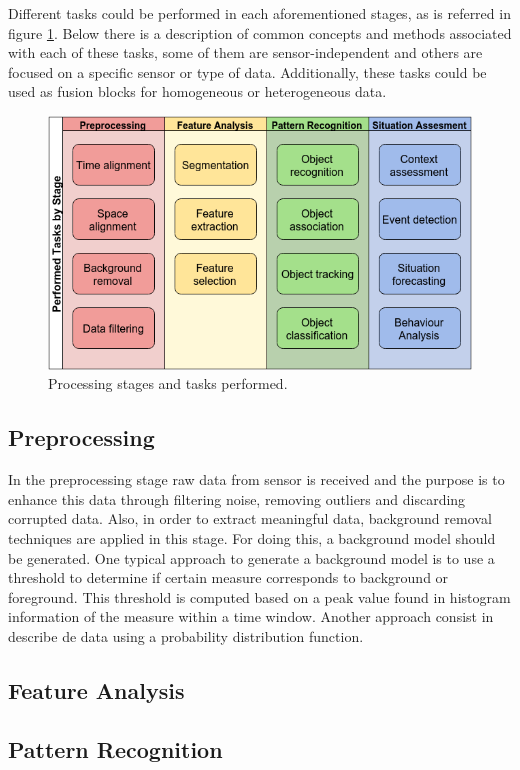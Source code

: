 \documentclass[10pt,twocolumn,letterpaper]{article}
\begin{document}
Different tasks could be performed in each aforementioned stages, as is referred in figure \ref{proc_stages_tasks}. Below there is a description of common concepts and methods associated with each of these tasks, some of them are sensor-independent and others are focused on a specific sensor or type of data. Additionally, these tasks could be used as fusion blocks for homogeneous or heterogeneous data.

\begin{figure}[ht!]
\centering
\includegraphics[scale=0.35]{../fig/3/processing_stages_and_tasks.png}
\caption{Processing stages and tasks performed.}
\label{proc_stages_tasks}
\end{figure}
\subsection{Preprocessing}
 In the preprocessing stage raw data from sensor is received and the purpose is to enhance this data through filtering noise, removing outliers and discarding corrupted data. Also, in order to extract meaningful data, background removal techniques are applied in this stage. For doing this, a background model should be generated. One typical approach to generate a background model is to use a threshold to determine if certain measure corresponds to background or foreground. This threshold is computed based on a peak value found in histogram information of the measure within a time window. Another approach consist in describe de data using a probability distribution function.
\subsection{Feature Analysis}
\subsection{Pattern Recognition}
\end{document}
